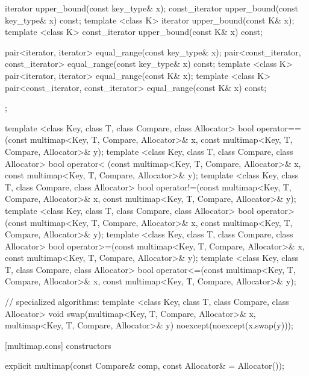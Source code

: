 \begin{codeblock}
{{    iterator       upper_bound(const key_type& x);
    const_iterator upper_bound(const key_type& x) const;
    template <class K> iterator       upper_bound(const K& x);
    template <class K> const_iterator upper_bound(const K& x) const;

    pair<iterator, iterator>               equal_range(const key_type& x);
    pair<const_iterator, const_iterator>   equal_range(const key_type& x) const;
    template <class K>
      pair<iterator, iterator>             equal_range(const K& x);
    template <class K>
      pair<const_iterator, const_iterator> equal_range(const K& x) const;
  };

  template <class Key, class T, class Compare, class Allocator>
    bool operator==(const multimap<Key, T, Compare, Allocator>& x,
                    const multimap<Key, T, Compare, Allocator>& y);
  template <class Key, class T, class Compare, class Allocator>
    bool operator< (const multimap<Key, T, Compare, Allocator>& x,
                    const multimap<Key, T, Compare, Allocator>& y);
  template <class Key, class T, class Compare, class Allocator>
    bool operator!=(const multimap<Key, T, Compare, Allocator>& x,
                    const multimap<Key, T, Compare, Allocator>& y);
  template <class Key, class T, class Compare, class Allocator>
    bool operator> (const multimap<Key, T, Compare, Allocator>& x,
                    const multimap<Key, T, Compare, Allocator>& y);
  template <class Key, class T, class Compare, class Allocator>
    bool operator>=(const multimap<Key, T, Compare, Allocator>& x,
                    const multimap<Key, T, Compare, Allocator>& y);
  template <class Key, class T, class Compare, class Allocator>
    bool operator<=(const multimap<Key, T, Compare, Allocator>& x,
                    const multimap<Key, T, Compare, Allocator>& y);

  // specialized algorithms:
  template <class Key, class T, class Compare, class Allocator>
    void swap(multimap<Key, T, Compare, Allocator>& x,
              multimap<Key, T, Compare, Allocator>& y)
      noexcept(noexcept(x.swap(y)));
}
\end{codeblock}%
%

[multimap.cons]{ constructors}

%
%
\begin{itemdecl}
explicit multimap(const Compare& comp, const Allocator& = Allocator());
\end{itemdecl}

